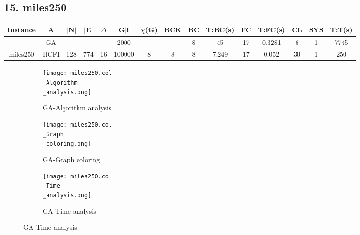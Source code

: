 \documentclass[10pt]{article}
\begin{document}
\subsection*{\hspace{0,9073976cm} 15. miles250}
\begin{table}[H]
\centering
\begin{tabular}{|c|c|c|c|c|c|c|c|c|c|c|c|c|c|c|}
\hline
Instance& A &$|$N$|$ & $|$E$|$ & $\Delta$ & G$|$I & $\chi$(G) &BCK&BC & T:BC(s) & FC & T:FC(s) & CL & SYS & T:T(s) \\ \hline \hline
&GA&       &                   &                     & 2000        &     \cellcolor{yellow} & {\cellcolor{yellow}}& {{\cellcolor{green}8}}
&45   &17        &0.3281                   & 6                   &1          &7745        \\ \cline{2-2} \cline{6-6} \cline{9-15}
 \multirow{-2}{*}{miles250} &HCFI   &\multirow{-2}{*}{128}   &\multirow{-2}{*}{774}     &\multirow{-2}{*}{16}     &100000      &\multirow{-2}{*}{\cellcolor{yellow}8}      & \multirow{-2}{*}{\cellcolor{yellow}8}    &{\cellcolor{green}8}     &7.249         &17    &0.052         &30    &1     &       250 \\ \hline 
\end{tabular}
\end{table}




\graphicspath{{./Core1/Solutions/GA/miles250.col}}
\begin{figure}[H]
\begin{subfigure}{.33\textwidth}
  \centering
  \texttt{[image: miles250.col\\\_Algorithm\\\_analysis.png]}
  \caption{GA-Algorithm analysis}
   \label{fig:subfig1}
\end{subfigure}%
\begin{subfigure}{.33\textwidth}
  \centering
  \texttt{[image: miles250.col\\\_Graph\\\_coloring.png]}
  \caption{GA-Graph coloring}
  \label{fig:subfig2}
\end{subfigure}
\begin{subfigure}{.33\textwidth}
  \centering
  \texttt{[image: miles250.col\\\_Time\\\_analysis.png]}
  \caption{GA-Time analysis}
  \end{subfigure}
\end{figure}
\end{document}
